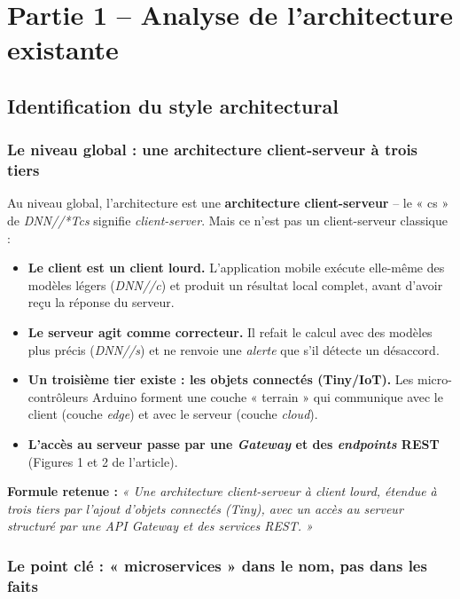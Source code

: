 \documentclass[11pt,a4paper]{article}
\begin{document}
\section{Partie 1 -- Analyse de l'architecture existante}

\subsection{Identification du style architectural}

\subsubsection{Le niveau global : une architecture client-serveur à trois tiers}

Au niveau global, l'architecture est une \textbf{architecture client-serveur} -- le « cs » de \textit{DNN//*Tcs} signifie \textit{client-server}. Mais ce n'est pas un client-serveur classique :

\begin{itemize}
    \item \textbf{Le client est un client lourd.} L'application mobile exécute elle-même des modèles légers (\textit{DNN//c}) et produit un résultat local complet, avant d'avoir reçu la réponse du serveur.
    \item \textbf{Le serveur agit comme correcteur.} Il refait le calcul avec des modèles plus précis (\textit{DNN//s}) et ne renvoie une \textit{alerte} que s'il détecte un désaccord.
    \item \textbf{Un troisième tier existe : les objets connectés (Tiny/IoT).} Les micro-contrôleurs Arduino forment une couche « terrain » qui communique avec le client (couche \textit{edge}) et avec le serveur (couche \textit{cloud}).
    \item \textbf{L'accès au serveur passe par une \textit{Gateway} et des \textit{endpoints} REST} (Figures 1 et 2 de l'article).
\end{itemize}

\textbf{Formule retenue :} \textit{« Une architecture client-serveur à client lourd, étendue à trois tiers par l'ajout d'objets connectés (Tiny), avec un accès au serveur structuré par une API Gateway et des services REST. »}

\subsubsection{Le point clé : « microservices » dans le nom, pas dans les faits}
\end{document}
